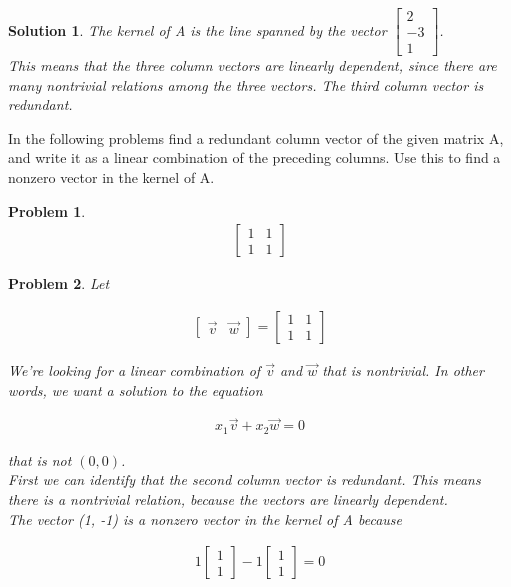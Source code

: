 \documentclass{article}
\newtheorem{problem}{Problem}
\newtheorem*{solution}{Solution}
\begin{document}
\begin{solution}
The kernel of A is the line spanned by the vector $\begin{bmatrix} 2 \\ -3 \\ 1 \end{bmatrix}$. \\

This means that the three column vectors are linearly dependent, since there are many nontrivial relations among the three vectors. The third column vector is redundant.

\end{solution}

In the following problems find a redundant column vector of the given matrix A, and write it as a linear combination of the preceding columns. Use this to find a nonzero vector in the kernel of A.

\begin{problem}
\begin{align*}
\begin{bmatrix}1 & 1 \\ 1 & 1 \end{bmatrix}
\end{align*}
\end{problem}

\begin{problem}
Let

\begin{align*}
\begin{bmatrix}\vec{v} & \vec{w} \end{bmatrix} = \begin{bmatrix}1 & 1 \\ 1 & 1 \end{bmatrix}
\end{align*}

We're looking for a linear combination of $\vec{v}$ and $\vec{w}$ that is nontrivial. In other words, we want a solution to the equation

\begin{align*}
x_{1} \vec{v} + x_{2} \vec{w} = 0
\end{align*}

that is not $(0, 0)$. \\

First we can identify that the second column vector is redundant. This means there is a nontrivial relation, because the vectors are linearly dependent. \\

The vector (1, -1) is a nonzero vector in the kernel of A because 

\begin{align*}
1\begin{bmatrix} 1 \\ 1 \end{bmatrix} - 1\begin{bmatrix} 1 \\ 1\end{bmatrix} = 0
\end{align*}

\end{problem}
\end{document}

